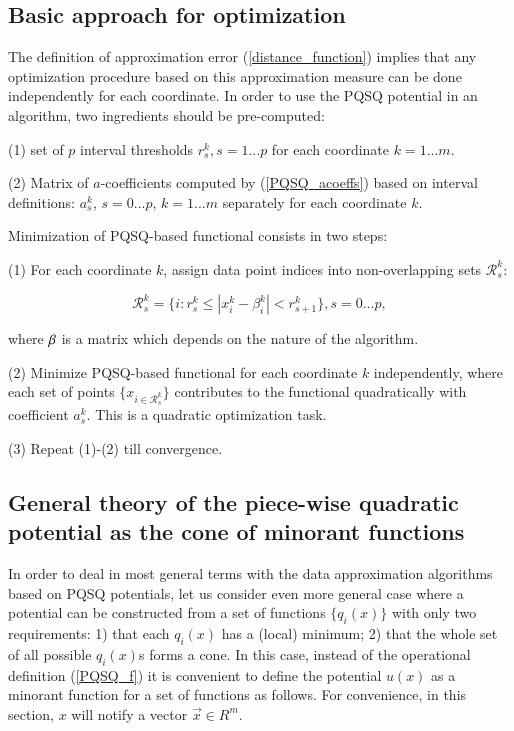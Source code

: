 \documentclass[preprint,12pt]{elsarticle}
\begin{document}
\subsection{Basic approach for optimization}

The definition of approximation error (\ref{distance_function}) implies that any optimization procedure based on this approximation measure can be done independently for each coordinate. In order to use the PQSQ potential in an algorithm, two ingredients should be pre-computed:

(1) set of $p$ interval thresholds $r_s^k, s=1...p$ for each coordinate $k=1...m$.

(2) Matrix of $a$-coefficients computed by (\ref{PQSQ_acoeffs}) based on interval definitions: $a_s^k$, $s=0...p$, $k=1...m$ separately for each coordinate $k$.

Minimization of PQSQ-based functional consists in two steps:

(1) For each coordinate $k$, assign data point indices into non-overlapping sets $\mathcal{R}_s^k$:

\begin{equation}
\mathcal{R}_s^k= \{i: r_{s}^k \leq |x_i^k-\beta^k_i| < r_{s+1}^k\}, s = 0...p,
\end{equation}

\noindent where $\bf{\beta}$ is a matrix which depends on the nature of the algorithm.

(2) Minimize PQSQ-based functional for each coordinate $k$ independently, where each set of points $\{x_{i\in \mathcal{R}_s^k}\}$ contributes
to the functional quadratically with coefficient $a_s^k$. This is a quadratic optimization task.

(3) Repeat (1)-(2) till convergence. 


\subsection{General theory of the piece-wise quadratic potential as the cone of minorant functions}\label{ConvergenceSection}

In order to deal in most general terms with the data approximation algorithms based on PQSQ potentials, let us consider even more general case where a potential can be constructed from a set of functions $\{q_i(x)\}$ with only two requirements: 1) that each $q_i(x)$ has a (local) minimum; 2) that the whole set of all possible $q_i(x)$s forms a cone. In this case, instead of the operational definition (\ref{PQSQ_f}) it is convenient to define the potential $u(x)$ as a minorant function for a set of functions as follows. For convenience, in this section, $x$ will notify a vector $\vec{x}\in R^m$.
\end{document}

